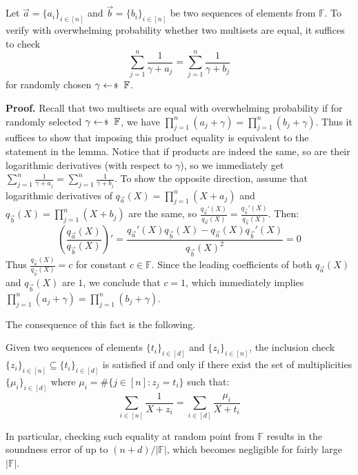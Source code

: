 \documentclass[../../book]{subfiles}
\begin{document}
\begin{lemma}
    Let $\vec{a} = \{a_i\}_{i \in [n]}$ and $\vec{b} = \{b_i\}_{i \in [n]}$ be
    two sequences of elements from $\mathbb{F}$. To verify with overwhelming
    probability whether two multisets are equal, it suffices to check
    \begin{equation*}
        \sum_{j=1}^n \frac{1}{\gamma + a_j} = \sum_{j=1}^n \frac{1}{\gamma+b_j}
    \end{equation*}
    for randomly chosen $\gamma \leftarrowS \mathbb{F}$.
\end{lemma}

\textbf{Proof.} Recall that two multisets are equal with overwhelming
probability if for randomly selected $\gamma \leftarrowS \mathbb{F}$, we have
$\prod_{j=1}^n (a_j+\gamma) = \prod_{j=1}^n (b_j+\gamma)$. Thus it suffices to
show that imposing this product equality is equivalent to the statement in the
lemma. Notice that if products are indeed the same, so are their logarithmic
derivatives (with respect to $\gamma$), so we immediately get $\sum_{j=1}^n
\frac{1}{\gamma + a_j} = \sum_{j=1}^n \frac{1}{\gamma+b_j}$. To show the
opposite direction, assume that logarithmic derivatives of $q_{\vec{a}}(X) =
\prod_{j=1}^n (X+a_j)$ and $q_{\vec{b}}(X) = \prod_{j=1}^n (X+b_j)$ are the same,
so $\frac{q_{\vec{a}}'(X)}{q_{\vec{a}}(X)} = \frac{q_{\vec{b}}'(X)}{q_{\vec{b}}(X)}$. Then:
\begin{equation*}
    \left(\frac{q_{\vec{a}}(X)}{q_{\vec{b}}(X)}\right)' = \frac{q_{\vec{a}}'(X)q_{\vec{b}}(X)-q_{\vec{a}}(X)q_{\vec{b}}'(X)}{q_{\vec{b}}(X)^2}=0
\end{equation*}
Thus $\frac{q_{\vec{a}}(X)}{q_{\vec{b}}(X)}=c$ for constant $c \in \mathbb{F}$.
Since the leading coefficients of both $q_{\vec{a}}(X)$ and $q_{\vec{b}}(X)$ are
$1$, we conclude that $c=1$, which immediately implies $\prod_{j=1}^n
(a_j+\gamma) = \prod_{j=1}^n (b_j+\gamma)$.

The consequence of this fact is the following.

\begin{lemma}
    Given two sequences of elements $\{t_i\}_{i \in [d]}$ and $\{z_i\}_{i \in
    [n]}$, the inclusion check $\{z_i\}_{i \in [n]} \subseteq \{t_i\}_{i \in
    [d]}$ is satisfied if and only if there exist the set of multiplicities
    $\{\mu_i\}_{i \in [d]}$ where $\mu_i = \#\{j \in [n]: z_j = t_i\}$ such that:
    \begin{equation*}
        \sum_{i \in [n]} \frac{1}{X+z_i} = \sum_{i \in [d]} \frac{\mu_i}{X+t_i}
    \end{equation*}

    In particular, checking such equality at random point from $\mathbb{F}$
    results in the soundness error of up to $(n+d)/|\mathbb{F}|$, which becomes
    negligible for fairly large $|\mathbb{F}|$.
\end{lemma}
\end{document}
